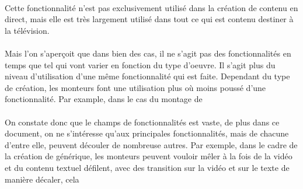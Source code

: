 \paragraph{ }
Cette fonctionnalité n'est pas exclusivement utilisé dans la création de contenu en direct, mais
elle est très largement utilisé dans tout ce qui est contenu destiner à la télévision.

\paragraph{}
\paragraph{}
Mais l'on s'aperçoit que dans bien des cas, il ne s'agit pas des fonctionnalités en temps
que tel qui vont varier en fonction du type d'oeuvre. Il s'agit plus du niveau d'utilisation
d'une même fonctionnalité qui est faite. Dependant du type de création, les monteurs font
une utilisation plus où moins poussé d'une fonctionnalité. Par example, dans le cas du montage
de


\paragraph{}
On constate donc que le champs de fonctionnalités est vaste, de plus dans ce
document, on ne s'intéresse qu'aux principales fonctionnalités, mais de chacune
d'entre elle, peuvent découler de nombreuse autres. Par exemple, dans le cadre
de la création de générique, les monteurs peuvent vouloir mêler à la fois de la
vidéo et du contenu textuel défilent, avec des transition sur la vidéo et sur le
texte de manière décaler, cela
